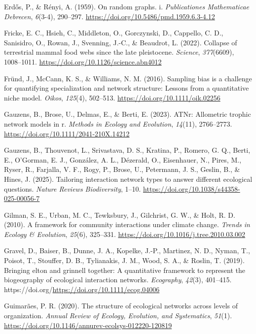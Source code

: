 \documentclass[
]{article}
\newlength{\cslhangindent}
\newenvironment{CSLReferences}[2] %
 {\begin{list}{}{%
  \setlength{\itemindent}{0pt}
  \setlength{\leftmargin}{0pt}
  \setlength{\parsep}{0pt}
  \ifodd #1
   \setlength{\leftmargin}{\cslhangindent}
   \setlength{\itemindent}{-1\cslhangindent}
  \fi
  \setlength{\itemsep}{#2\baselineskip}}}
 {\end{list}}
\begin{document}
\begin{CSLReferences}{1}{0}
Erdős, P., \& Rényi, A. (1959). On random graphs. i. \emph{Publicationes
Mathematicae Debrecen}, \emph{6}(3-4), 290--297.
\url{https://doi.org/10.5486/pmd.1959.6.3-4.12}

Fricke, E. C., Hsieh, C., Middleton, O., Gorczynski, D., Cappello, C.
D., Sanisidro, O., Rowan, J., Svenning, J.-C., \& Beaudrot, L. (2022).
Collapse of terrestrial mammal food webs since the late pleistocene.
\emph{Science}, \emph{377}(6609), 1008--1011.
\url{https://doi.org/10.1126/science.abn4012}

Fründ, J., McCann, K. S., \& Williams, N. M. (2016). Sampling bias is a
challenge for quantifying specialization and network structure: Lessons
from a quantitative niche model. \emph{Oikos}, \emph{125}(4), 502--513.
\url{https://doi.org/10.1111/oik.02256}

Gauzens, B., Brose, U., Delmas, E., \& Berti, E. (2023). ATNr:
Allometric trophic network models in r. \emph{Methods in Ecology and
Evolution}, \emph{14}(11), 2766--2773.
\url{https://doi.org/10.1111/2041-210X.14212}

Gauzens, B., Thouvenot, L., Srivastava, D. S., Kratina, P., Romero, G.
Q., Berti, E., O'Gorman, E. J., González, A. L., Dézerald, O.,
Eisenhauer, N., Pires, M., Ryser, R., Farjalla, V. F., Rogy, P., Brose,
U., Petermann, J. S., Geslin, B., \& Hines, J. (2025). Tailoring
interaction network types to answer different ecological questions.
\emph{Nature Reviews Biodiversity}, 1--10.
\url{https://doi.org/10.1038/s44358-025-00056-7}

Gilman, S. E., Urban, M. C., Tewksbury, J., Gilchrist, G. W., \& Holt,
R. D. (2010). A framework for community interactions under climate
change. \emph{Trends in Ecology \& Evolution}, \emph{25}(6), 325--331.
\url{https://doi.org/10.1016/j.tree.2010.03.002}

Gravel, D., Baiser, B., Dunne, J. A., Kopelke, J.-P., Martinez, N. D.,
Nyman, T., Poisot, T., Stouffer, D. B., Tylianakis, J. M., Wood, S. A.,
\& Roslin, T. (2019). Bringing elton and grinnell together: A
quantitative framework to represent the biogeography of ecological
interaction networks. \emph{Ecography}, \emph{42}(3), 401--415.
https://doi.org/\url{https://doi.org/10.1111/ecog.04006}

Guimarães, P. R. (2020). The structure of ecological networks across
levels of organization. \emph{Annual Review of Ecology, Evolution, and
Systematics}, \emph{51}(1).
\url{https://doi.org/10.1146/annurev-ecolsys-012220-120819}


\end{CSLReferences}
\end{document}
